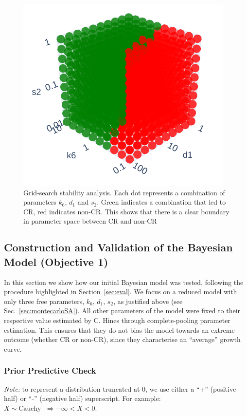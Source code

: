 \documentclass[11pt]{article}
\begin{document}
\begin{figure}[!ht]
    \centering\includegraphics[scale=0.5]{stability.png}
    \caption{Grid-search stability analysis. Each dot represents a combination of parameters $k_6$, $d_1$ and $s_2$. Green indicates a combination that led to CR, red indicates non-CR. This shows that there is a clear boundary in parameter space between CR and non-CR}
    \label{fig:mcsa}
\end{figure}

\subsection{Construction and Validation of the Bayesian Model (Objective 1)}
In this section we show how our initial Bayesian model was tested, following the procedure highlighted in Section~\ref{sec:eval}. We focus on a reduced model with only three free parameters, $k_6$, $d_1$, $s_2$, as justified above (see Sec.~\ref{sec:montecarloSA}). All other parameters of the model were fixed to their respective value estimated by C. Hines through complete-pooling parameter estimation. This ensures that they do not bias the model towards an extreme outcome (whether CR or non-CR), since they characterise an ``average'' growth curve.

\subsubsection{Prior Predictive Check}
\textit{Note:} to represent a distribution truncated at 0, we use either a ``+'' (positive half) or ``-'' (negative half) superscript. For example: $X \sim  \text{Cauchy}^- \Rightarrow - \infty < X < 0$.
\end{document}
